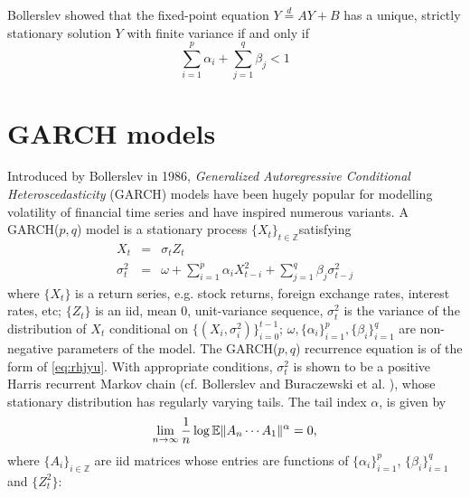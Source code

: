 Bollerslev \cite{bollerslev:1986} showed that the fixed-point equation
$Y \overset{d}{=} A Y + B$ has a unique, strictly stationary solution
$Y$ with finite variance if and only if
\begin{equation}
  \sum_{i=1}^p \alpha_i + \sum_{j=1}^q \beta_j < 1
  \label{eq:bollerslev:intro}
\end{equation}

\section{GARCH models}
Introduced by Bollerslev \cite{bollerslev:1986} in 1986,
{\em Generalized Autoregressive Conditional Heteroscedasticity}
(GARCH) models have been hugely popular for modelling volatility of
financial time series and have inspired numerous variants.
A GARCH($p, q$) model is a stationary process
$\{X_t\}_{t \in \mathbb Z}$satisfying
\begin{eqnarray*}
  X_t &=& \sigma_t Z_t \\
  \sigma_t^2 &=& \omega + \sum_{i=1}^p \alpha_i X_{t-i}^2 +
  \sum_{j=1}^q \beta_j \sigma_{t-j}^2
\end{eqnarray*}
where $\{X_t\}$ is a return series, e.g. stock returns, foreign exchange
rates, interest rates, etc; $\{Z_t\}$ is an iid, mean 0, unit-variance
sequence, $\sigma_t^2$ is the variance of the distribution of $X_t$
conditional on
$\{(X_i, \sigma_i^2)\}_{i=0}^{t-1}$; $\omega, \{\alpha_i\}_{i=1}^p,
\{\beta_i\}_{i=1}^q$
are non-negative parameters of the model. The GARCH($p,q$) recurrence
equation is of the form of \eqref{eq:rhjyu}. With appropriate
conditions, $\sigma_t^2$ is shown to be a positive Harris recurrent
Markov chain (cf. Bollerslev \cite{bollerslev:1986} and Buraczewski et al.
\cite{buraczewski:damek:mikosch:2016}), whose stationary distribution
has regularly varying tails. The tail index $\alpha$, is given by
\begin{equation}
  \label{eq:grgbg}
  \lim_{n \to \infty} {1 \over n}\log\mathbb{E}\|A_n \cdots A_1\|^\alpha = 0,
\end{equation}
where $\{A_i\}_{i \in \mathbb Z}$ are iid matrices whose entries are
functions of $\{\alpha_i\}_{i=1}^p$, $\{\beta_i\}_{i=1}^q$ and
$\{Z_t^2\}$:
